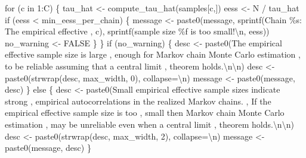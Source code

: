 \documentclass[
  letterpaper,
  DIV=11,
  numbers=noendperiod]{scrartcl}
\newenvironment{Shaded}{\begin{snugshade}}{\end{snugshade}}
\newcommand{\CharTok}[1]{\textcolor[rgb]{0.13,0.47,0.30}{#1}}
\newcommand{\ControlFlowTok}[1]{\textcolor[rgb]{0.00,0.23,0.31}{#1}}
\newcommand{\DecValTok}[1]{\textcolor[rgb]{0.68,0.00,0.00}{#1}}
\newcommand{\KeywordTok}[1]{\textcolor[rgb]{0.00,0.23,0.31}{#1}}
\newcommand{\NormalTok}[1]{\textcolor[rgb]{0.00,0.23,0.31}{#1}}
\newcommand{\OperatorTok}[1]{\textcolor[rgb]{0.37,0.37,0.37}{#1}}
\newcommand{\SpecialCharTok}[1]{\textcolor[rgb]{0.37,0.37,0.37}{#1}}
\newcommand{\StringTok}[1]{\textcolor[rgb]{0.13,0.47,0.30}{#1}}
\begin{document}
\begin{Shaded}
\begin{Highlighting}[]
  \ControlFlowTok{for}\NormalTok{ (c }\KeywordTok{in} \DecValTok{1}\NormalTok{:C) \{}
\NormalTok{    tau\_hat }\OperatorTok{\textless{}{-}}\NormalTok{ compute\_tau\_hat(samples[c,])}
\NormalTok{    eess }\OperatorTok{\textless{}{-}}\NormalTok{ N }\OperatorTok{/}\NormalTok{ tau\_hat}
    \ControlFlowTok{if}\NormalTok{ (eess }\OperatorTok{\textless{}}\NormalTok{ min\_eess\_per\_chain) \{}
\NormalTok{      message }\OperatorTok{\textless{}{-}}\NormalTok{ paste0(message,}
\NormalTok{                        sprintf(}\StringTok{\textquotesingle{}Chain }\SpecialCharTok{\%s}\StringTok{: The empirical effective \textquotesingle{}}\NormalTok{, c),}
\NormalTok{                        sprintf(}\StringTok{\textquotesingle{}sample size }\SpecialCharTok{\%f}\StringTok{ is too small!}\CharTok{\textbackslash{}n}\StringTok{\textquotesingle{}}\NormalTok{, eess))}
\NormalTok{      no\_warning }\OperatorTok{\textless{}{-}}\NormalTok{ FALSE}
\NormalTok{    \}}
\NormalTok{  \}}
  \ControlFlowTok{if}\NormalTok{ (no\_warning) \{}
\NormalTok{    desc }\OperatorTok{\textless{}{-}}\NormalTok{ paste0(}\StringTok{\textquotesingle{}The empirical effective sample size is large \textquotesingle{}}\NormalTok{,}
                   \StringTok{\textquotesingle{}enough for Markov chain Monte Carlo estimation \textquotesingle{}}\NormalTok{,}
                   \StringTok{\textquotesingle{}to be reliable assuming that a central limit \textquotesingle{}}\NormalTok{,}
                   \StringTok{\textquotesingle{}theorem holds.}\CharTok{\textbackslash{}n\textbackslash{}n}\StringTok{\textquotesingle{}}\NormalTok{)}
\NormalTok{    desc }\OperatorTok{\textless{}{-}}\NormalTok{ paste0(strwrap(desc, max\_width, }\DecValTok{0}\NormalTok{), collapse}\OperatorTok{=}\StringTok{\textquotesingle{}}\CharTok{\textbackslash{}n}\StringTok{\textquotesingle{}}\NormalTok{)}
\NormalTok{    message }\OperatorTok{\textless{}{-}}\NormalTok{ paste0(message, desc)}
\NormalTok{  \} }\ControlFlowTok{else}\NormalTok{ \{}
\NormalTok{    desc }\OperatorTok{\textless{}{-}}\NormalTok{ paste0(}\StringTok{\textquotesingle{}Small empirical effective sample sizes indicate strong \textquotesingle{}}\NormalTok{,}
                   \StringTok{\textquotesingle{}empirical autocorrelations in the realized Markov chains. \textquotesingle{}}\NormalTok{,}
                   \StringTok{\textquotesingle{}If the empirical effective sample size is too \textquotesingle{}}\NormalTok{,}
                   \StringTok{\textquotesingle{}small then Markov chain Monte Carlo estimation \textquotesingle{}}\NormalTok{,}
                   \StringTok{\textquotesingle{}may be unreliable even when a central limit \textquotesingle{}}\NormalTok{,}
                   \StringTok{\textquotesingle{}theorem holds.}\CharTok{\textbackslash{}n\textbackslash{}n}\StringTok{\textquotesingle{}}\NormalTok{)}
\NormalTok{    desc }\OperatorTok{\textless{}{-}}\NormalTok{ paste0(strwrap(desc, max\_width, }\DecValTok{2}\NormalTok{), collapse}\OperatorTok{=}\StringTok{\textquotesingle{}}\CharTok{\textbackslash{}n}\StringTok{\textquotesingle{}}\NormalTok{)}
\NormalTok{    message }\OperatorTok{\textless{}{-}}\NormalTok{ paste0(message, desc)}
\NormalTok{  \}}
  

\end{Highlighting}
\end{Shaded}
\end{document}
